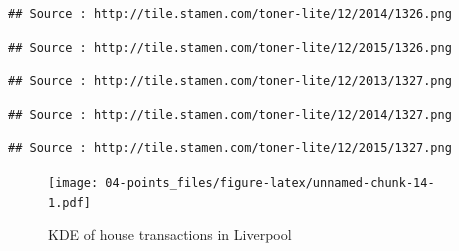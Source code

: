 \documentclass[
]{book}
\newenvironment{Shaded}{\begin{snugshade}}{\end{snugshade}}
\newcommand{\CharTok}[1]{\textcolor[rgb]{0.31,0.60,0.02}{#1}}
\newcommand{\CommentTok}[1]{\textcolor[rgb]{0.56,0.35,0.01}{\textit{#1}}}
\newcommand{\DataTypeTok}[1]{\textcolor[rgb]{0.13,0.29,0.53}{#1}}
\newcommand{\DecValTok}[1]{\textcolor[rgb]{0.00,0.00,0.81}{#1}}
\newcommand{\FloatTok}[1]{\textcolor[rgb]{0.00,0.00,0.81}{#1}}
\newcommand{\KeywordTok}[1]{\textcolor[rgb]{0.13,0.29,0.53}{\textbf{#1}}}
\newcommand{\NormalTok}[1]{#1}
\newcommand{\OperatorTok}[1]{\textcolor[rgb]{0.81,0.36,0.00}{\textbf{#1}}}
\newcommand{\OtherTok}[1]{\textcolor[rgb]{0.56,0.35,0.01}{#1}}
\newcommand{\StringTok}[1]{\textcolor[rgb]{0.31,0.60,0.02}{#1}}
\begin{document}
\begin{verbatim}
## Source : http://tile.stamen.com/toner-lite/12/2014/1326.png
\end{verbatim}

\begin{verbatim}
## Source : http://tile.stamen.com/toner-lite/12/2015/1326.png
\end{verbatim}

\begin{verbatim}
## Source : http://tile.stamen.com/toner-lite/12/2013/1327.png
\end{verbatim}

\begin{verbatim}
## Source : http://tile.stamen.com/toner-lite/12/2014/1327.png
\end{verbatim}

\begin{verbatim}
## Source : http://tile.stamen.com/toner-lite/12/2015/1327.png
\end{verbatim}

\begin{Shaded}
\end{Shaded}

\begin{figure}
\centering
\texttt{[image: 04-points\_files/figure-latex/unnamed-chunk-14-1.pdf]}
\caption{\label{fig:unnamed-chunk-14}KDE of house transactions in Liverpool}
\end{figure}
\end{document}
